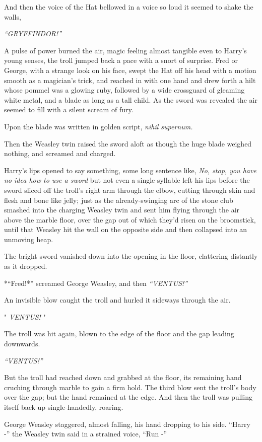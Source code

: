 And then the voice of the Hat bellowed in a voice so loud it seemed to
shake the walls,

\emph{``GRYFFINDOR!''}

A pulse of power burned the air, magic feeling almost tangible even to
Harry's young senses, the troll jumped back a pace with a snort of
surprise. Fred or George, with a strange look on his face, swept the Hat
off his head with a motion smooth as a magician's trick, and reached in
with one hand and drew forth a hilt whose pommel was a glowing ruby,
followed by a wide crossguard of gleaming white metal, and a blade as
long as a tall child. As the sword was revealed the air seemed to fill
with a silent scream of fury.

Upon the blade was written in golden script, \emph{nihil supernum.}

Then the Weasley twin raised the sword aloft as though the huge blade
weighed nothing, and screamed and charged.

Harry's lips opened to say something, some long sentence like, \emph{No,
stop, you have no idea how to use a sword} but not even a single
syllable left his lips before the sword sliced off the troll's right arm
through the elbow, cutting through skin and flesh and bone like jelly;
just as the already-swinging arc of the stone club smashed into the
charging Weasley twin and sent him flying through the air above the
marble floor, over the gap out of which they'd risen on the broomstick,
until that Weasley hit the wall on the opposite side and then collapsed
into an unmoving heap.

The bright sword vanished down into the opening in the floor, clattering
distantly as it dropped.

*``Fred!*'' screamed George Weasley, and then \emph{``VENTUS!''}

An invisible blow caught the troll and hurled it sideways through the
air.

" \emph{VENTUS!} "

The troll was hit again, blown to the edge of the floor and the gap
leading downwards.

\emph{``VENTUS!''}

But the troll had reached down and grabbed at the floor, its remaining
hand cruching through marble to gain a firm hold. The third blow sent
the troll's body over the gap; but the hand remained at the edge. And
then the troll was pulling itself back up single-handedly, roaring.

George Weasley staggered, almost falling, his hand dropping to his side.
``Harry -'' the Weasley twin said in a strained voice, ``Run -''

